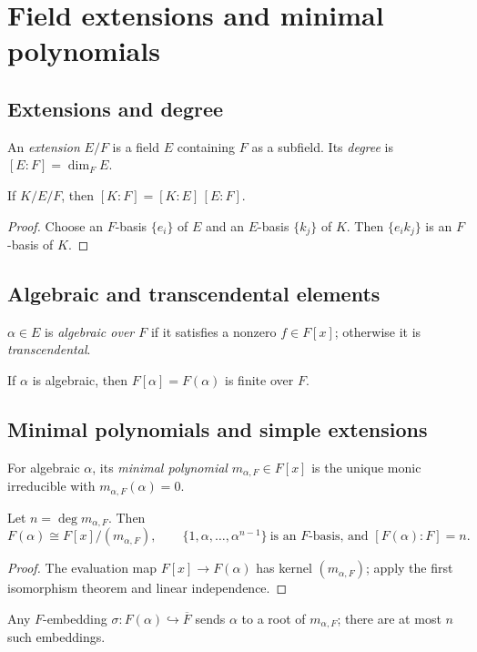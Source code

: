 \section{Field extensions and minimal polynomials}\label{sec:extensions-minimal}

\subsection{Extensions and degree}
\begin{definition}
An \emph{extension} $E/F$ is a field $E$ containing $F$ as a subfield. Its \emph{degree} is $[E\!:\!F]=\dim_F E$.
\end{definition}
\begin{theorem}\label{thm:tower-law}
If $K/E/F$, then $[K\!:\!F]=[K\!:\!E]\,[E\!:\!F]$.
\end{theorem}
\begin{proof}
Choose an $F$-basis $\{e_i\}$ of $E$ and an $E$-basis $\{k_j\}$ of $K$. Then $\{e_i k_j\}$ is an $F$-basis of $K$.
\end{proof}

\subsection{Algebraic and transcendental elements}
\begin{definition}
$\alpha\in E$ is \emph{algebraic over $F$} if it satisfies a nonzero $f\in F[x]$; otherwise it is \emph{transcendental}.
\end{definition}
\begin{proposition}
If $\alpha$ is algebraic, then $F[\alpha]=F(\alpha)$ is finite over $F$.
\end{proposition}

\subsection{Minimal polynomials and simple extensions}
\begin{definition}
For algebraic $\alpha$, its \emph{minimal polynomial} $m_{\alpha,F}\in F[x]$ is the unique monic irreducible with $m_{\alpha,F}(\alpha)=0$.
\end{definition}
\begin{proposition}\label{prop:simple}
Let $n=\deg m_{\alpha,F}$. Then
\[
F(\alpha)\cong F[x]/(m_{\alpha,F}),\qquad
\{1,\alpha,\dots,\alpha^{n-1}\}\ \text{is an $F$-basis, and } [F(\alpha)\!:\!F]=n.
\]
\end{proposition}
\begin{proof}
The evaluation map $F[x]\to F(\alpha)$ has kernel $(m_{\alpha,F})$; apply the first isomorphism theorem and linear independence.
\end{proof}
\begin{remark}[Conjugates]
Any $F$-embedding $\sigma:F(\alpha)\hookrightarrow \overline{F}$ sends $\alpha$ to a root of $m_{\alpha,F}$; there are at most $n$ such embeddings.
\end{remark}


